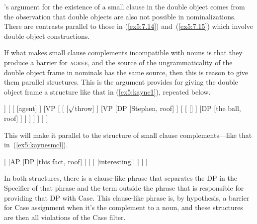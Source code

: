 \citet{Kayne:1981b}'s argument for the existence of a small clause in the double object comes from the observation that double objects are also not possible in nominalizations. There are contrasts parallel to those in (\ref{ex5:7.14}) and~(\ref{ex5:7.15}) which involve double object constructions.
\begin{exe}
	\raggedright
	\ex \label{ex5:kaynedoa} 
	\begin{xlist}
	\end{xlist}
\hspace*{\fill} \citep[based on (61)\&(62): 161]{Kayne:1981b} \hspace*{.5in}
\end{exe}
If what makes small clause complements incompatible with nouns is that they produce a barrier for \textsc{agree}, and the source of the ungrammaticality of the double object frame in nominals has the same source, then this is reason to give them parallel structures. This is the argument \citet{Kayne:1984d} provides for giving the double object frame a structure like that in (\ref{ex5:kayne1}), repeated below. 
\begin{exe}
	\raggedright
	\small
	\begin{forest}
	[vP
		[DP [Ania, roof]]
		[ 
			[ ]
			[VP [
				[ [$\surd$throw] ]
				[VP 
					[DP [Stephen, roof] ]
					[
						[ [] ]
						[DP [the ball, roof] ]
					 ]
				 ]
			] ]
		]
	]
	\end{forest}
\end{exe}
This will make it parallel to the structure of small clause complements---like that in~(\ref{ex5:kaynesmcl}).
\begin{exe}
	\raggedright
	\ex \label{ex5:kaynesmcl} 
	\small
	\begin{forest}
	[\ibar{V}
		[\obar{V} [$\surd$believe] ]
		[AP 
			[DP [this fact, roof] ]
			[ [ [interesting]] ]
		]
	]
	\end{forest}
\end{exe}
In both structures, there is a clause-like phrase that separates the DP in the Specifier of that phrase and the term outside the phrase that is responsible for providing that DP with Case. This clause-like phrase is, by hypothesis, a barrier for Case assignment when it's the complement to a noun, and these structures are then all violations of the Case filter.

